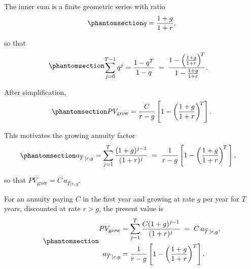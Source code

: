 \documentclass[
  letterpaper,
  DIV=11,
  numbers=noendperiod]{scrreprt}
\begin{document}
The inner sum is a finite geometric series with ratio
\begin{equation}\protect\phantomsection\label{eq-gen-0006}{
\begin{align}
    q = \frac{1 + g}{1 + r},
\end{align}
}\end{equation}

so that \begin{equation}\protect\phantomsection\label{eq-gen-0007}{
\begin{align}
    \sum_{j=0}^{T-1} q^j &= \frac{1 - q^{T}}{1 - q}
    \;=\; \frac{1 - \left(\frac{1 + g}{1 + r}\right)^{\!T}}{1 - \frac{1 + g}{1 + r}}.
\end{align}
}\end{equation}

After simplification,
\begin{equation}\protect\phantomsection\label{eq-gen-0008}{
\begin{align}
    PV_{\text{grow}}
    = \frac{C}{r - g}  \left[1 - \left(\frac{1 + g}{1 + r}\right)^{\!T}\right].
\end{align}
}\end{equation}

This motivates the growing annuity factor
\begin{equation}\protect\phantomsection\label{eq-gen-0009}{
\begin{align}
    a_{\overline{T}\,|r,g}
    &= \sum_{j=1}^{T} \frac{(1 + g)^{j-1}}{(1 + r)^j}
     \;=\; \frac{1}{r - g}
        \left[1 - \left(\frac{1 + g}{1 + r}\right)^{\!T}\, \right],
\end{align}
}\end{equation}

so that \(PV_{\text{grow}} = C \, a_{\overline{T}|r,g}\).

\begin{tcolorbox}[enhanced jigsaw, arc=.35mm, bottomrule=.15mm, bottomtitle=1mm, breakable, colback=white, colbacktitle=quarto-callout-note-color!10!white, colframe=quarto-callout-note-color-frame, coltitle=black, left=2mm, leftrule=.75mm, opacityback=0, opacitybacktitle=0.6, rightrule=.15mm, title=\textcolor{quarto-callout-note-color}{\faInfo}\hspace{0.5em}{Note}, titlerule=0mm, toprule=.15mm, toptitle=1mm]

For an annuity paying \(C\) in the first year and growing at rate \(g\)
per year for \(T\) years, discounted at rate \(r > g\), the present
value is \begin{equation}\protect\phantomsection\label{eq-gen-0010}{
\begin{align}
    PV_{\text{grow}}
    &= \sum_{j=1}^{T} \frac{C (1 + g)^{j-1}}{(1 + r)^j}
     \;=\; C \, a_{\overline{T}\,|r,g}, \\
    a_{\overline{T}\,|r,g}
    &= \frac{1}{r - g} \left[1 - \left(\frac{1 + g}{1 + r}\right)^{T}\right].
\end{align}
}\end{equation}

\end{tcolorbox}
\end{document}
